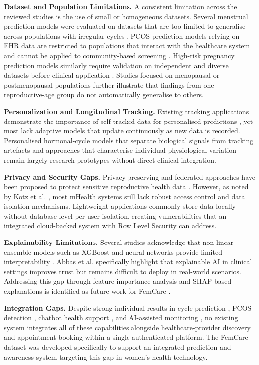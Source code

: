 \textbf{Dataset and Population Limitations.}
A consistent limitation across the reviewed studies is the use of small or homogeneous datasets. Several menstrual prediction models were evaluated on datasets that are too limited to generalise across populations with irregular cycles \cite{khairunisa2025,rego2023,li2021}. PCOS prediction models relying on EHR data are restricted to populations that interact with the healthcare system and cannot be applied to community-based screening \cite{zad2024}. High-risk pregnancy prediction models similarly require validation on independent and diverse datasets before clinical application \cite{pi2025}. Studies focused on menopausal or postmenopausal populations \cite{ali2023,isayev2023} further illustrate that findings from one reproductive-age group do not automatically generalise to others.

\textbf{Personalization and Longitudinal Tracking.}
Existing tracking applications demonstrate the importance of self-tracked data for personalised predictions \cite{epstein2017,liu2019}, yet most lack adaptive models that update continuously as new data is recorded. Personalised hormonal-cycle models that separate biological signals from tracking artefacts \cite{li2021,urteaga2017} and approaches that characterise individual physiological variation \cite{li2020,goodale2019} remain largely research prototypes without direct clinical integration.

\textbf{Privacy and Security Gaps.}
Privacy-preserving and federated approaches have been proposed to protect sensitive reproductive health data \cite{rajesh2025,kotz2016}. However, as noted by Kotz et al. \cite{kotz2016}, most mHealth systems still lack robust access control and data isolation mechanisms. Lightweight applications commonly store data locally without database-level per-user isolation, creating vulnerabilities that an integrated cloud-backed system with Row Level Security can address.

\textbf{Explainability Limitations.}
Several studies acknowledge that non-linear ensemble models such as XGBoost and neural networks provide limited interpretability \cite{ahmed2023,zad2024}. Abbas et al. \cite{abbas2025} specifically highlight that explainable AI in clinical settings improves trust but remains difficult to deploy in real-world scenarios. Addressing this gap through feature-importance analysis and SHAP-based explanations is identified as future work for FemCare \cite{lundberg2017}.

\textbf{Integration Gaps.}
Despite strong individual results in cycle prediction \cite{li2021,rego2023,khairunisa2025}, PCOS detection \cite{ahmed2023,zad2024,rahman2024}, chatbot health support \cite{kim2024,maity2025}, and AI-assisted monitoring \cite{iturriago2025,soni2025}, no existing system integrates all of these capabilities alongside healthcare-provider discovery and appointment booking within a single authenticated platform. The FemCare dataset \cite{dataset} was developed specifically to support an integrated prediction and awareness system targeting this gap in women's health technology.

